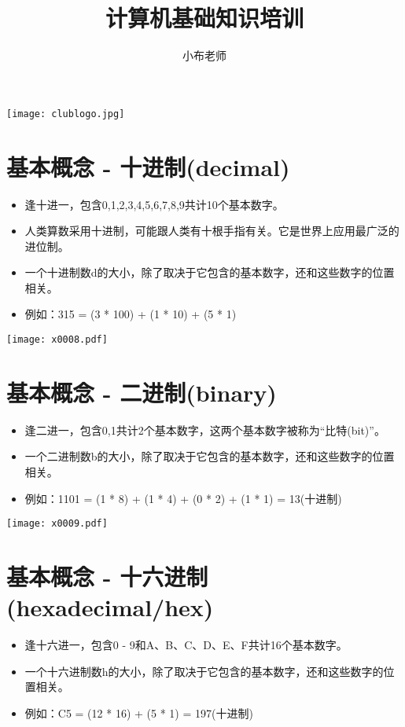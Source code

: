 \documentclass[cn,hazy,blue,14pt,screen]{elegantnote}
\title{计算机基础知识培训}
\author{小布老师}
\institute{樱桃溪学院}
\date{\zhdate{2025/03/28}}
\begin{document}
\maketitle

\centerline{
  \texttt{[image: clublogo.jpg]}
}

\section{基本概念 - 十进制(decimal)}
\begin{itemize}
  \item 逢十进一，包含0,1,2,3,4,5,6,7,8,9共计10个基本数字。 
  \item 人类算数采用十进制，可能跟人类有十根手指有关。它是世界上应用最广泛的进位制。
  \item 一个十进制数d的大小，除了取决于它包含的基本数字，还和这些数字的位置相关。
  \item 例如：315 = (3 * 100) + (1 * 10) + (5 * 1)
\end{itemize}

\begin{center}
	\texttt{[image: x0008.pdf]}
\end{center}

\newpage

\section{基本概念 - 二进制(binary)}
\begin{itemize}
  \item 逢二进一，包含0,1共计2个基本数字，这两个基本数字被称为“比特(bit)”。 
  \item 一个二进制数b的大小，除了取决于它包含的基本数字，还和这些数字的位置相关。
  \item 例如：1101 = (1 * 8) + (1 * 4) + (0 * 2) + (1 * 1) = 13(十进制)
\end{itemize}

\begin{center}
	\texttt{[image: x0009.pdf]}
\end{center}

\newpage

\section{基本概念 - 十六进制(hexadecimal/hex)}
\begin{itemize}
  \item 逢十六进一，包含0 - 9和A、B、C、D、E、F共计16个基本数字。 
  \item 一个十六进制数h的大小，除了取决于它包含的基本数字，还和这些数字的位置相关。
  \item 例如：C5 = (12 * 16) + (5 * 1) = 197(十进制)
\end{itemize}
\end{document}
